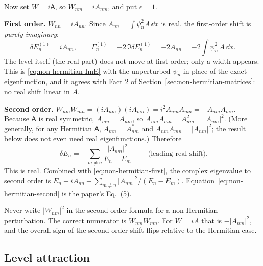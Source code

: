 Now set $W=i\mathsf A$, so $W_{nm}=iA_{nm}$, and put $\epsilon=1$.

\textbf{First order.} $W_{nn}=iA_{nn}$. Since $A_{nn}=\int\psi_n^2A\,\dd x$ is real, the first-order shift is \emph{purely imaginary}:
\begin{equation}
\delta E_n^{(1)} = i A_{nn}, \qquad \Gamma_n^{(1)} = -2\,\Im\delta E_n^{(1)} = -2A_{nn} = -2\int\psi_n^2\,A\,\dd x .
\label{eq:non-hermitian-first}
\end{equation}
The level itself (the real part) does not move at first order; only a width appears. This is \eqref{eq:non-hermitian-ImE} with the unperturbed $\psi_n$ in place of the exact eigenfunction, and it agrees with Fact 2 of Section~\ref{sec:non-hermitian-matrices}: no real shift linear in $A$.

\textbf{Second order.} $W_{nm}W_{mn} = (iA_{nm})(iA_{mn}) = i^2A_{nm}A_{mn} = -A_{nm}A_{mn}$. Because $\mathsf A$ is real symmetric, $A_{mn}=A_{nm}$, so $A_{nm}A_{mn}=A_{nm}^2=|A_{nm}|^2$. (More generally, for any Hermitian $\mathsf A$, $A_{mn}=A_{nm}^*$ and $A_{nm}A_{mn}=|A_{nm}|^2$; the result below does not even need real eigenfunctions.) Therefore
\begin{equation}
\boxed{\;\delta E_n = -\sum_{m\ne n}\frac{|A_{nm}|^2}{E_n-E_m}\;}
\qquad\text{(leading real shift)}.
\label{eq:non-hermitian-second}
\end{equation}
This is real. Combined with \eqref{eq:non-hermitian-first}, the complex eigenvalue to second order is $E_n + iA_{nn} - \sum_{m\ne n}|A_{nm}|^2/(E_n-E_m)$. Equation~\eqref{eq:non-hermitian-second} is the paper's Eq.~(5).

\begin{pitfall}
Never write $|W_{nm}|^2$ in the second-order formula for a non-Hermitian perturbation. The correct numerator is $W_{nm}W_{mn}$. For $W=iA$ that is $-|A_{nm}|^2$, and the overall sign of the second-order shift flips relative to the Hermitian case.
\end{pitfall}

\subsection{Level attraction}

